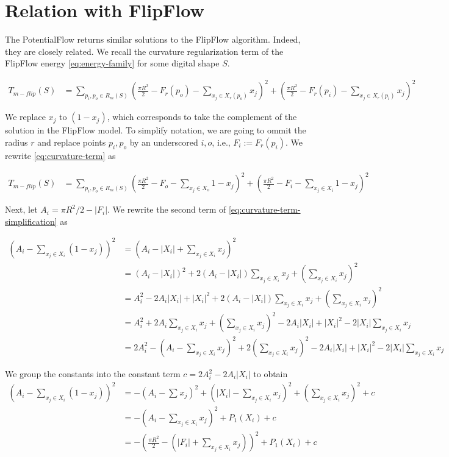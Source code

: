 \section{Relation with FlipFlow}
	The PotentialFlow returns similar solutions to the FlipFlow algorithm. Indeed, they are closely related. We recall the curvature regularization term of the FlipFlow energy \eqref{eq:energy-family} for some digital shape $S$. 

\begin{align}
T_{m-flip}(S) &= \sum_{ p_i,p_o \in R_m(S)}{ ( \frac{\pi R^2}{2} - F_r(p_o) - \sum_{x_j \in X_r(p_o)}{x_j})^2 + (\frac{\pi R^2}{2} - F_r(p_i) - \sum_{x_j \in X_r(p_i)}{x_j})^2 }
\label{eq:curvature-term}
\end{align}

We replace $x_j$ to $(1-x_j)$, which corresponds to take the complement of the solution in the FlipFlow model. To simplify notation, we are going to ommit the radius $r$ and replace points $p_i,p_o$ by an underscored $i,o$, i.e., $F_i := F_r(p_i)$. We rewrite \eqref{eq:curvature-term} as

\begin{align}
T_{m-flip}(S) &= \sum_{ p_i,p_o \in R_m(S)}{ ( \frac{\pi R^2}{2} - F_o - \sum_{x_j \in X_o}{1-x_j})^2 + (\frac{\pi R^2}{2} - F_i - \sum_{x_j \in X_i}{1-x_j})^2 }
\label{eq:curvature-term-simplification}
\end{align}

Next, let $A_i = \pi R^2/2 - |F_i|$. We rewrite  the second term of \eqref{eq:curvature-term-simplification} as

\begin{align*}
	(A_i - \sum_{x_j \in X_i}{ (1-x_j) })^2 &= (A_i - |X_i| + \sum_{x_j \in X_i}{ x_j })^2 \\
	&= (A_i - |X_i|)^2 + 2(A_i - |X_i|)\sum_{x_j \in X_i}{x_j} + ( \sum_{x_j \in X_i}{x_j} )^2\\	
	&= A_i^2 -2A_i|X_i| + |X_i|^2 + 2(A_i - |X_i|)\sum_{x_j \in X_i}{x_j} + ( \sum_{x_j \in X_i}{x_j} )^2\\
	&= A_i^2 + 2A_i\sum_{x_j \in X_i}{x_j} + ( \sum_{x_j \in X_i}{x_j} )^2 - 2A_i|X_i| + |X_i|^2 -2|X_i|\sum_{x_j \in X_i}{x_j} \\
	&= 2A_i^2 - (A_i - \sum_{x_j \in X_i}{x_j})^2 + 2( \sum_{x_j \in X_i}{x_j} ) ^2 - 2A_i|X_i| + |X_i|^2 - 2|X_i|\sum_{x_j \in X_i}{x_j}
\end{align*}

	We group the constants into the constant term $c=2A_i^2 - 2A_i|X_i|$	 to obtain
\begin{align}
		(A_i - \sum_{x_j \in X_i}{ (1-x_j) })^2 &= - (A_i - \sum_{}{x_j})^2 + (|X_i| - \sum_{x_j \in X_i}{x_j})^2 + (\sum_{x_j \in X_i}{x_j})^2 + c \nonumber \\
	&= - (A_i - \sum_{x_j \in X_i}{x_j})^2 + P_1(X_i) + c \nonumber \\
	&= - (\frac{\pi R^2}{2} - (|F_i| + \sum_{x_j \in X_i}{x_j}) )^2 + P_1(X_i) + c \nonumber 	
	\label{eq:second-term}
\end{align}

